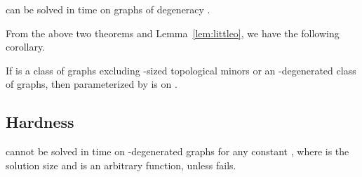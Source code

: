 \begin{theorem}\label{}
 {\ds} can be solved in time  on graphs of degeneracy .
\end{theorem}

\noindent
From the above two theorems and Lemma~\ref{lem:littleo}, we have the following corollary.

\begin{corollary}
If  is a class of graphs excluding -sized topological minors or an -degenerated class of graphs, then {\ds} parameterized by  is {\FPT} on . 
\end{corollary}

\subsection{Hardness}

\begin{theorem}\label{thm:ds hardness logn}
{\ds} cannot be solved in time  on -degenerated graphs for any constant , where  is the solution size and  is an arbitrary function, unless {\ETH} fails.
\end{theorem}


